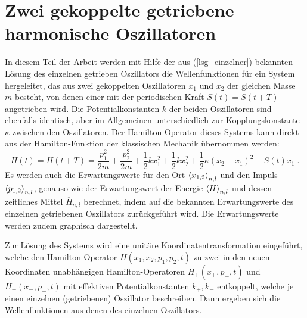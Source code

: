 \chapter{Zwei gekoppelte getriebene harmonische Oszillatoren}
\label{4}

In diesem Teil der Arbeit werden mit Hilfe der aus (\ref{lsg_einzelner}) bekannten Lösung des einzelnen getrieben Oszillators die Wellenfunktionen für ein System hergeleitet, das aus zwei gekoppelten Oszillatoren $x_1$ und $x_2$ der gleichen Masse $m$ besteht, von denen einer mit der periodischen Kraft $S(t) = S(t+T)$ angetrieben wird.
Die Potentialkonstanten $k$ der beiden Oszillatoren sind ebenfalls identisch, aber im Allgemeinen unterschiedlich zur Kopplungskonstante $\kappa$ zwischen den Oszillatoren.
Der Hamilton-Operator dieses Systems kann direkt aus der Hamilton-Funktion  der klassischen Mechanik übernommen werden:
\begin{equation}
  H(t) = H(t+T) = \frac{p_1^2}{2m} + \frac{p_2^2}{2m} + \frac 1 2 kx_1^2 + \frac 1 2 kx_2^2 + \frac 1 2 \kappa(x_2-x_1)^2 - S(t)x_1 \; .
  \label{H_gekoppelt}
\end{equation}
Es werden auch die Erwartungswerte für  den Ort $\braket{x_{1,2}}_{n,l}$ und den Impuls $\braket{p_{1,2}}_{n,l}$, genauso wie der Erwartungswert der Energie $\braket{H}_{n,l}$ und dessen zeitliches Mittel $\overline{H}_{n,l}$ berechnet, indem auf die bekannten Erwartungswerte des einzelnen getriebenen Oszillators zurückgeführt wird.
Die Erwartungswerte werden zudem graphisch dargestellt.

Zur Lösung des Systems wird eine unitäre Koordinatentransformation eingeführt, welche den Hamilton-Operator $H(x_1,x_2,p_1,p_2,t)$ zu zwei in den neuen Koordinaten unabhängigen Hamilton-Operatoren $H_+(x_+,p_+,t)$ und $H_-(x_-,p_-,t)$ mit effektiven Potentialkonstanten $k_+,k_-$ entkoppelt, welche je einen einzelnen (getriebenen) Oszillator beschreiben.
Dann ergeben sich die Wellenfunktionen aus denen des einzelnen Oszillators.




